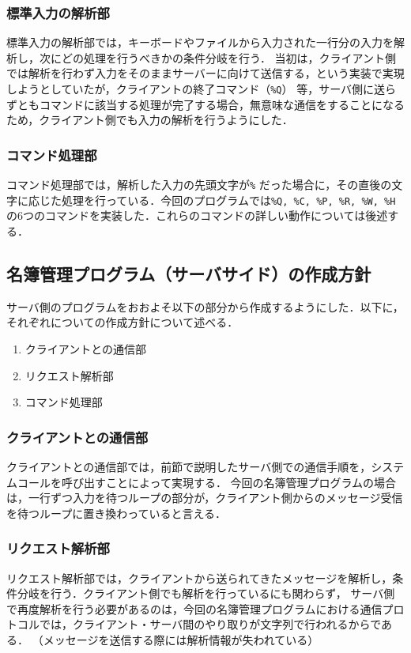 \documentclass[11pt]{jsarticle}
\begin{document}
\subsubsection{標準入力の解析部}
標準入力の解析部では，キーボードやファイルから入力された一行分の入力を解析し，次にどの処理を行うべきかの条件分岐を行う．
当初は，クライアント側では解析を行わず入力をそのままサーバーに向けて送信する，という実装で実現しようとしていたが，クライアントの終了コマンド（{\tt \%Q}）
等，サーバ側に送らずともコマンドに該当する処理が完了する場合，無意味な通信をすることになるため，クライアント側でも入力の解析を行うようにした．

\subsubsection{コマンド処理部}
コマンド処理部では，解析した入力の先頭文字が{\tt \%}
だった場合に，その直後の文字に応じた処理を行っている．今回のプログラムでは{\tt \%Q, \%C, \%P, \%R, \%W, \%H}
の6つのコマンドを実装した．これらのコマンドの詳しい動作については後述する．

\subsection{名簿管理プログラム（サーバサイド）の作成方針}

サーバ側のプログラムをおおよそ以下の部分から作成するようにした．以下に，それぞれについての作成方針について述べる．

\begin{enumerate}
      \item クライアントとの通信部
      \item リクエスト解析部
      \item コマンド処理部
\end{enumerate}

\subsubsection{クライアントとの通信部}
クライアントとの通信部では，前節で説明したサーバ側での通信手順を，システムコールを呼び出すことによって実現する．
今回の名簿管理プログラムの場合は，一行ずつ入力を待つループの部分が，クライアント側からのメッセージ受信を待つループに置き換わっていると言える．

\subsubsection{リクエスト解析部}
リクエスト解析部では，クライアントから送られてきたメッセージを解析し，条件分岐を行う．クライアント側でも解析を行っているにも関わらず，
サーバ側で再度解析を行う必要があるのは，今回の名簿管理プログラムにおける通信プロトコルでは，クライアント・サーバ間のやり取りが文字列で行われるからである．
（メッセージを送信する際には解析情報が失われている）
\end{document}
